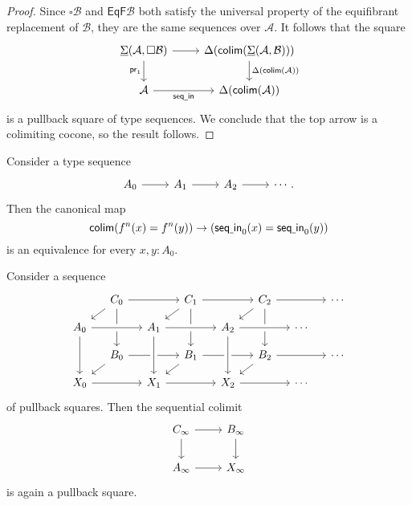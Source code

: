 \begin{proof}
Since $\square\mathcal{B}$ and $\mathsf{EqF}\mathcal{B}$ both satisfy the universal property of the equifibrant replacement of $\mathcal{B}$, they are the same sequences over $\mathcal{A}$. It follows that the square
\begin{equation*}
\begin{tikzcd}
\msm{\mathcal{A}}{\square\mathcal{B}} \arrow[r] \arrow[d,swap,"\proj 1"] & \Delta(\mathsf{colim}(\msm{\mathcal{A}}{\mathcal{B}})) \arrow[d,"\Delta(\mathsf{colim}(\mathcal{A}))"] \\
\mathcal{A} \arrow[r,swap,"\mathsf{seq\usc{}in}"] & \Delta(\mathsf{colim}(\mathcal{A}))
\end{tikzcd}
\end{equation*}
is a pullback square of type sequences. We conclude that the top arrow is a colimiting cocone, so the result follows.
\end{proof}

\begin{cor}\label{thm:colim_id}
Consider a type sequence
\begin{equation*}
\begin{tikzcd}
A_0 \arrow[r] & A_1 \arrow[r] & A_2 \arrow[r] & \cdots.
\end{tikzcd}
\end{equation*}
Then the canonical map
\begin{equation*}
\mathsf{colim}(f^n(x)= f^n(y)) \to (\mathsf{seq\underline{\ }{}in}_0(x)=\mathsf{seq\underline{\ }{}in}_0(y))
\end{equation*}
is an equivalence for every $x,y:A_0$.
\end{cor}

\begin{thm}\label{thm:seq_colim_pb}
Consider a sequence
\begin{equation*}
\begin{tikzcd}[column sep=small,row sep=small]
& C_0 \arrow[dl] \arrow[dd] \arrow[rr] & & C_1 \arrow[dl] \arrow[dd] \arrow[rr] & & C_2 \arrow[dl] \arrow[dd] \arrow[rr] & & \cdots \\
A_0 \arrow[dd] \arrow[rr,crossing over] & & A_1 \arrow[rr,crossing over] & & A_2 \arrow[rr,crossing over] & & \cdots \\
& B_0 \arrow[dl] \arrow[rr] & & B_1 \arrow[dl] \arrow[rr] & & B_2 \arrow[dl] \arrow[rr] & & \cdots \\
X_0 \arrow[rr] & \phantom{B_2} & X_1 \arrow[rr] \arrow[from=uu,crossing over] & \phantom{B_2} & X_2 \arrow[rr] \arrow[from=uu,crossing over] & \phantom{B_2} & \cdots
\end{tikzcd}
\end{equation*}
of pullback squares. Then the sequential colimit
\begin{equation*}
\begin{tikzcd}
C_\infty \arrow[r] \arrow[d] & B_\infty \arrow[d] \\
A_\infty \arrow[r] & X_\infty
\end{tikzcd}
\end{equation*}
is again a pullback square.
\end{thm}

